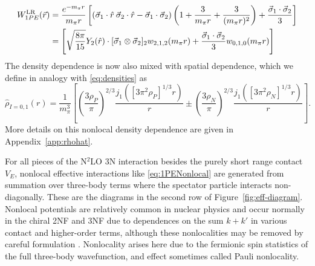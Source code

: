 \begin{equation}\begin{split}
W^{\text{LR}}_{1PE}(\vec{r})&=\frac{e^{-m_\pi r}}{m_\pi r}\left[\left(\vec{\sigma}_1\cdot\hat{r}\:\vec{\sigma}_2\cdot\hat{r}-\vec{\sigma}_1\cdot\vec{\sigma}_2\right)\left(1+\frac{3}{m_\pi r}+\frac{3}{(m_\pi r)^2}\right)+\frac{\vec{\sigma}_1\cdot\vec{\sigma}_2}{3}\right] \\
&=\left[\sqrt{\frac{8\pi}{15}}Y_2(\hat{r})\cdot[\vec{\sigma}_1\otimes\vec{\sigma}_2]_2w_{2,1,2}(m_\pi r)+\frac{\vec{\sigma}_1\cdot\vec{\sigma}_2}{3}w_{0,1,0}(m_\pi r)\right]
\end{split}
\end{equation}
The density dependence is now also mixed with spatial dependence, which we define in analogy with \eqref{eq:densities} as 
\begin{equation}\label{eq:hatdensities}
\hat{\rho}_{I=0,1}(r)=%
\frac{1}{m_\pi^3}\left[ \left(\frac{3 \rho_P}{\pi}\right)^{2/3} \frac{ j_1( [3\pi^2 \rho_P]^{1/3}  r)}{ r} \pm \left(\frac{3 \rho_N}{\pi}\right)^{2/3} \frac{ j_1( [3\pi^2 \rho_N]^{1/3}  r)}{ r} \right].
\end{equation}
More details on this nonlocal density dependence are given in Appendix~\ref{app:rhohat}.

For all pieces of the N$^2$LO 3N interaction besides the purely short range contact $V_E$, nonlocal effective interactions like \eqref{eq:1PENonlocal} are generated from summation over three-body terms where the spectator particle interacts non-diagonally. These are the diagrams in the second row of Figure~\ref{fig:eff-diagram}. Nonlocal potentials are relatively common in nuclear physics and occur normally in the chiral 2NF and 3NF due to dependences on the sum  $k+k'$ in various contact and higher-order terms, although these nonlocalities may be removed by careful formulation \cite{PhysRevLett.111.032501}. Nonlocality arises here due to the fermionic spin statistics of the full three-body wavefunction, and effect sometimes called Pauli nonlocality. 


